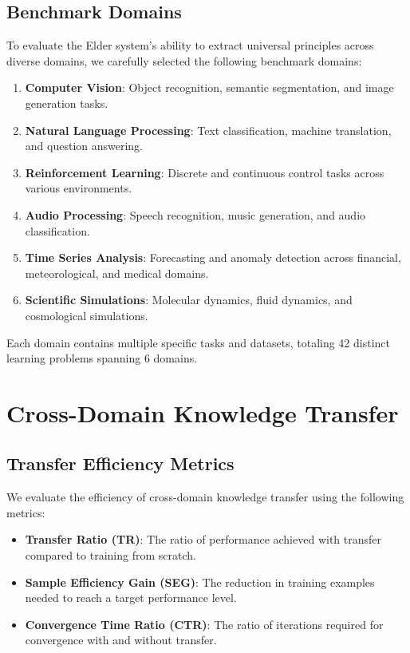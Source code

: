 \subsection{Benchmark Domains}

To evaluate the Elder system's ability to extract universal principles across diverse domains, we carefully selected the following benchmark domains:

\begin{enumerate}
    \item \textbf{Computer Vision}: Object recognition, semantic segmentation, and image generation tasks.
    
    \item \textbf{Natural Language Processing}: Text classification, machine translation, and question answering.
    
    \item \textbf{Reinforcement Learning}: Discrete and continuous control tasks across various environments.
    
    \item \textbf{Audio Processing}: Speech recognition, music generation, and audio classification.
    
    \item \textbf{Time Series Analysis}: Forecasting and anomaly detection across financial, meteorological, and medical domains.
    
    \item \textbf{Scientific Simulations}: Molecular dynamics, fluid dynamics, and cosmological simulations.
\end{enumerate}

Each domain contains multiple specific tasks and datasets, totaling 42 distinct learning problems spanning 6 domains.

\section{Cross-Domain Knowledge Transfer}

\subsection{Transfer Efficiency Metrics}

We evaluate the efficiency of cross-domain knowledge transfer using the following metrics:

\begin{itemize}
    \item \textbf{Transfer Ratio (TR)}: The ratio of performance achieved with transfer compared to training from scratch.
    
    \item \textbf{Sample Efficiency Gain (SEG)}: The reduction in training examples needed to reach a target performance level.
    
    \item \textbf{Convergence Time Ratio (CTR)}: The ratio of iterations required for convergence with and without transfer.
\end{itemize}

